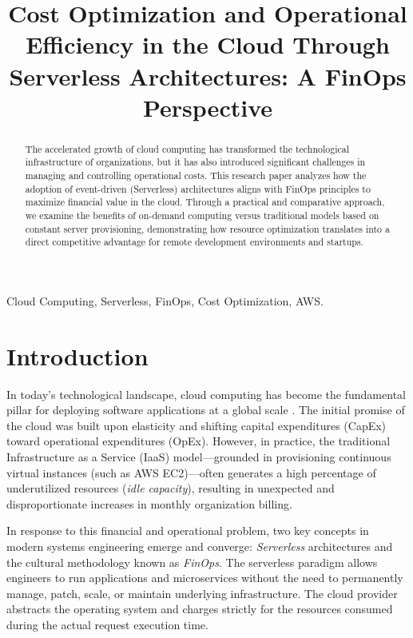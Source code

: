 \documentclass[conference]{IEEEtran}
\title{Cost Optimization and Operational Efficiency in the Cloud Through Serverless Architectures: A FinOps Perspective}
\author{
    \IEEEauthorblockN{Harold Steven Caiza Cruz}
    \IEEEauthorblockA{Escuela de Ingeniería en Sistemas de la Información\\
    Universidad Internacional del Ecuador (UIDE)\\
    Quito, Ecuador\\
    Email: hacaizacr@uide.edu.ec}
}
\begin{document}
\maketitle

\begin{abstract}
The accelerated growth of cloud computing has transformed the technological infrastructure of organizations, but it has also introduced significant challenges in managing and controlling operational costs. This research paper analyzes how the adoption of event-driven (Serverless) architectures aligns with FinOps principles to maximize financial value in the cloud. Through a practical and comparative approach, we examine the benefits of on-demand computing versus traditional models based on constant server provisioning, demonstrating how resource optimization translates into a direct competitive advantage for remote development environments and startups.
\end{abstract}

\begin{IEEEkeywords}
Cloud Computing, Serverless, FinOps, Cost Optimization, AWS.
\end{IEEEkeywords}

\section{Introduction}
In today's technological landscape, cloud computing has become the fundamental pillar for deploying software applications at a global scale \cite{aws_serverless}. The initial promise of the cloud was built upon elasticity and shifting capital expenditures (CapEx) toward operational expenditures (OpEx). However, in practice, the traditional Infrastructure as a Service (IaaS) model—grounded in provisioning continuous virtual instances (such as AWS EC2)—often generates a high percentage of underutilized resources (\textit{idle capacity}), resulting in unexpected and disproportionate increases in monthly organization billing.

In response to this financial and operational problem, two key concepts in modern systems engineering emerge and converge: \textit{Serverless} architectures and the cultural methodology known as \textit{FinOps}. The serverless paradigm allows engineers to run applications and microservices without the need to permanently manage, patch, scale, or maintain underlying infrastructure. The cloud provider abstracts the operating system and charges strictly for the resources consumed during the actual request execution time.
\end{document}
